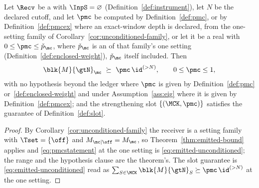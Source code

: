 
\begin{corollary}
\label{cor:emitted-unconditioned}
Let $\Recv$ be a  with $\InpS=\varnothing$
(Definition~\ref{def:instrument}), let $N$ be the declared cutoff, and let
$\pmc$ be computed by Definition~\ref{def:pmc}, or by
Definition~\ref{def:pmcex} where an exact-window depth is declared, from the
one-setting family of Corollary~\ref{cor:unconditioned-family}, or let it be
a real with $0\le\pmc\le\check p_{\mc}$, where $\check p_{\mc}$ is an
 of that family's one setting
(Definition~\ref{def:enclosed-weight}), $\check p_{\mc}$ itself included. Then
\begin{equation}\label{eq:emitted-unconditioned}
  \blk{M}{\gtN}_{\mc}\ \succeq\ \pmc\,\id^{(>N)},\qquad 0\le\pmc\le1,
\end{equation}
with no hypothesis beyond the ledger where $\pmc$ is given by
Definition~\ref{def:pmc} or~\ref{def:enclosed-weight} and under
Assumption~\ref{ass:eig} where it is given by Definition~\ref{def:pmcex}; and
the strengthening slot
$\{(\MCK,\pmc)\}$ satisfies the guarantee of Definition~\ref{def:slot}.
\end{corollary}

\begin{proof}
By Corollary~\ref{cor:unconditioned-family} the receiver is a setting
family with $\Tset=\{\off\}$ and $M_{\mc|\off}=M_{\mc}$, so
Theorem~\ref{thm:emitted-bound} applies and \eqref{eq:pmcstatement} at the one
setting is \eqref{eq:emitted-unconditioned}; the range and the hypothesis
clause are the theorem's. The slot guarantee is
\eqref{eq:emitted-unconditioned} read as $\sum_{S\in\MCK}\blk{M}{\gtN}_S
\succeq\pmc\,\id^{(>N)}$ at the one setting.
\end{proof}
